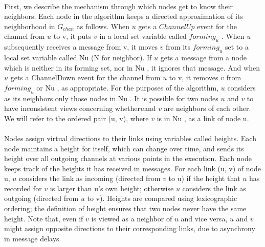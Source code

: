 \paragraph{}First, we describe the mechanism through which nodes get to know their neighbors. Each node in the algorithm keeps a directed approximation of its neighborhood in $G_{chan}$ as follows. When $u$ gets a $ChannelUp$ event for the channel from $u$ to v, it puts $v$ in a local set variable called $forming_u$ . When $u$ subsequently receives a message from v, it moves $v$ from its $forming_u$ set to a local set variable called Nu (N for neighbor). If $u$ gets a message from a node which is neither in its forming set, nor in Nu , it ignores that message. And when $u$ gets a ChannelDown event for the channel from $u$ to v, it removes $v$ from $forming_u$ or Nu , as appropriate. For the purposes of the algorithm, $u$ considers as its neighbors only those nodes in Nu . It is possible for two nodes $u$ and $v$ to have inconsistent views concerning whether$u$and $v$ are neighbors of each other. We will refer to the ordered pair (u, v), where $v$ is in Nu , as a link of node u.
\paragraph{}Nodes assign virtual directions to their links using variables called heights. Each node maintains a height for itself, which can change over time, and sends its height over all outgoing channels at various points in the execution. Each node keeps track of the heights it has received in messages. For each link (u, v) of node u, $u$ considers the link as incoming (directed from $v$ to u) if the height that $u$ has recorded for $v$ is larger than u’s own height; otherwise $u$ considers the link as outgoing (directed from $u$ to v). Heights are compared using lexicographic ordering; the definition of height ensures that two nodes never have the same height. Note that, even if $v$ is viewed as a neighbor of $u$ and vice versa, $u$ and $v$ might assign opposite directions to their corresponding links, due to asynchrony in message delays.

